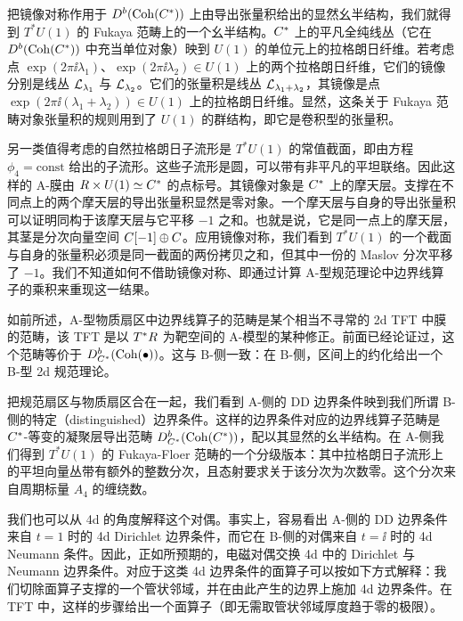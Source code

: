 把镜像对称作用于 $D^b(\mathrm{Coh}(C^*))$ 上由导出张量积给出的显然幺半结构，我们就得到 $T^*U(1)$ 的 Fukaya 范畴上的一个幺半结构。$C^*$ 上的平凡全纯线丛（它在 $D^b(\mathrm{Coh}(C^*))$ 中充当单位对象）映到 $U(1)$ 的单位元上的拉格朗日纤维。若考虑点 $\exp(2\pi\ii\lambda_1)$、$\exp(2\pi\ii\lambda_2)\in U(1)$ 上的两个拉格朗日纤维，它们的镜像分别是线丛 $\mathcal{L}_{\lambda_1}$ 与 $\mathcal{L}_{\lambda_2}$。它们的张量积是线丛 $\mathcal{L}_{\lambda_1+\lambda_2}$，其镜像是点 $\exp(2\pi\ii(\lambda_1+\lambda_2))\in U(1)$ 上的拉格朗日纤维。显然，这条关于 Fukaya 范畴对象张量积的规则用到了 $U(1)$ 的群结构，即它是卷积型的张量积。

另一类值得考虑的自然拉格朗日子流形是 $T^*U(1)$ 的常值截面，即由方程 $\phi_4=\text{const}$ 给出的子流形。这些子流形是圆，可以带有非平凡的平坦联络。因此这样的 A-膜由 $R\times U(1)\simeq C^*$ 的点标号。其镜像对象是 $C^*$ 上的摩天层。支撑在不同点上的两个摩天层的导出张量积显然是零对象。一个摩天层与自身的导出张量积可以证明同构于该摩天层与它平移 $-1$ 之和。也就是说，它是同一点上的摩天层，其茎是分次向量空间 $C[-1]\oplus C$。应用镜像对称，我们看到 $T^*U(1)$ 的一个截面与自身的张量积必须是同一截面的两份拷贝之和，但其中一份的 Maslov 分次平移了 $-1$。我们不知道如何不借助镜像对称、即通过计算 A-型规范理论中边界线算子的乘积来重现这一结果。


如前所述，A-型物质扇区中边界线算子的范畴是某个相当不寻常的 2d TFT 中膜的范畴，该 TFT 是以 $T^*R$ 为靶空间的 A-模型的某种修正。前面已经论证过，这个范畴等价于 $D^b_{C^*}(\mathrm{Coh}(\bullet))$。这与 B-侧一致：在 B-侧，区间上的约化给出一个 B-型 2d 规范理论。

把规范扇区与物质扇区合在一起，我们看到 A-侧的 DD 边界条件映到我们所谓 B-侧的特定（distinguished）边界条件。这样的边界条件对应的边界线算子范畴是 $C^*$-等变的凝聚层导出范畴 $D^b_{C^*}(\mathrm{Coh}(C^*))$，配以其显然的幺半结构。在 A-侧我们得到 $T^*U(1)$ 的 Fukaya-Floer 范畴的一个分级版本：其中拉格朗日子流形上的平坦向量丛带有额外的整数分次，且态射要求关于该分次为次数零。这个分次来自周期标量 $A_4$ 的缠绕数。

我们也可以从 4d 的角度解释这个对偶。事实上，容易看出 A-侧的 DD 边界条件来自 $t=1$ 时的 4d Dirichlet 边界条件，而它在 B-侧的对偶来自 $t=\ii$ 时的 4d Neumann 条件。因此，正如所预期的，电磁对偶交换 4d 中的 Dirichlet 与 Neumann 边界条件。对应于这类 4d 边界条件的面算子可以按如下方式解释：我们切除面算子支撑的一个管状邻域，并在由此产生的边界上施加 4d 边界条件。在 TFT 中，这样的步骤给出一个面算子（即无需取管状邻域厚度趋于零的极限）。

